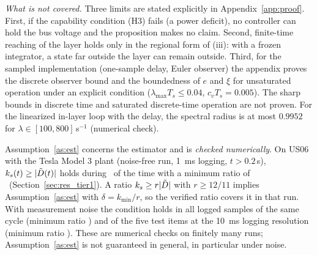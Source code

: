 \emph{What is not covered.} Three limits are stated explicitly in Appendix~\ref{app:proof}. First, if the capability condition (H3) fails (a power deficit), no controller can hold the bus voltage and the proposition makes no claim. Second, finite-time reaching of the layer holds only in the regional form of (iii): with a frozen integrator, a state far outside the layer can remain outside. Third, for the sampled implementation (one-sample delay, Euler observer) the appendix proves the discrete observer bound and the boundedness of $e$ and $\xi$ for unsaturated operation under an explicit condition ($\lambda_{\max}T_s\le0.04$, $c_vT_s=0.005$). The sharp bounds in discrete time and saturated discrete-time operation are not proven. For the linearized in-layer loop with the delay, the spectral radius is at most $0.9952$ for $\lambda\in[100,800]$\,s$^{-1}$ (numerical check).

Assumption~\ref{as:est} concerns the estimator and is \emph{checked numerically}. On US06 with the Tesla Model 3 plant (noise-free run, \SI{1}{ms} logging, $t>0.2$\,s), $k_s(t)\ge|\tilde{D}(t)|$ holds during \AssumptionHoldPct\ of the time with a minimum ratio of \MinKsRatio\ (Section~\ref{sec:res_tier1}). A ratio $k_s\ge r|\tilde{D}|$ with $r\ge12/11$ implies Assumption~\ref{as:est} with $\delta=k_{\min}/r$, so the verified ratio covers it in that run. With measurement noise the condition holds in all logged samples of the same cycle (minimum ratio \AsmNoisyMinRatio) and of the five test items at the \SI{10}{ms} logging resolution (minimum ratio \AsmMThreeMinRatio). These are numerical checks on finitely many runs; Assumption~\ref{as:est} is not guaranteed in general, in particular under noise.
